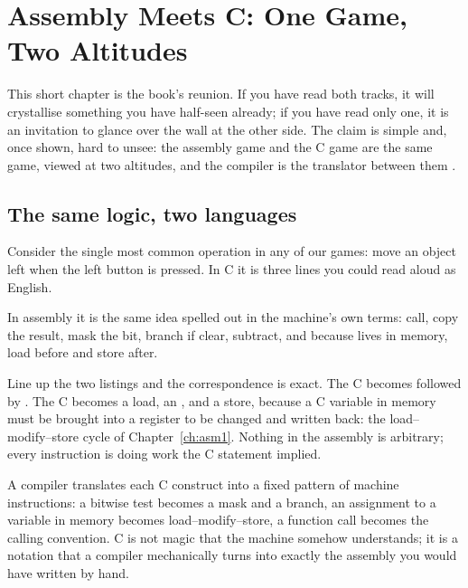 \chapter{Assembly Meets C: One Game, Two Altitudes}
\label{ch:join}

This short chapter is the book's reunion. If you have read both tracks, it will
crystallise something you have half-seen already; if you have read only one, it is
an invitation to glance over the wall at the other side. The claim is simple and,
once shown, hard to unsee: the assembly game and the C game are the same game,
viewed at two altitudes, and the compiler is the translator between them
\citep{prg32teaching}.

\section{The same logic, two languages}

Consider the single most common operation in any of our games: move an object left
when the left button is pressed. In C it is three lines you could read aloud as
English.



In assembly it is the same idea spelled out in the machine's own terms: call,
copy the result, mask the bit, branch if clear, subtract, and because
 lives in memory, load before and store after.



Line up the two listings and the correspondence is exact. The C  becomes  followed by . The C  becomes a load, an , and a store, because a C variable in memory
must be brought into a register to be changed and written back: the
load--modify--store cycle of Chapter~\ref{ch:asm1}. Nothing in the assembly is
arbitrary; every instruction is doing work the C statement implied.

\begin{prgconcept}
A compiler translates each C construct into a fixed pattern of machine
instructions: a bitwise test becomes a mask and a branch, an assignment to a
variable in memory becomes load--modify--store, a function call becomes the
calling convention. C is not magic that the machine somehow understands; it is a
notation that a compiler mechanically turns into exactly the assembly you would
have written by hand.
\end{prgconcept}

